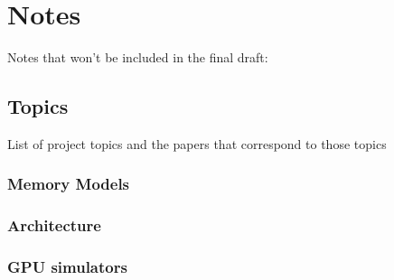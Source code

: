 \documentclass[conference]{IEEEtran}
\begin{document}
\clearpage
\appendix
\section{Notes}
Notes that won't be included in the final draft:
\subsection{Topics}
List of project topics and the papers that correspond to those topics
\subsubsection{Memory Models}
\cite{Bakhoda2009}
\cite{Ibrahim2020}
\cite{Singh2013}
\cite{Pratheek2023}
\cite{Mei2015}
\cite{Liu2018}
\cite{Fung2011ISM}
\cite{Jog2013OWL}
\cite{Kadam2018}
\cite{Liu2020}
\cite{Jog2013}
\subsubsection{Architecture}
\cite{Bakhoda2009}
\cite{Yan2022}
\cite{Hayes2019}
\cite{Sanudo2020}
\cite{Laguna2022}
\cite{Zhu2019}
\cite{Fung2011HPC}
\subsubsection{GPU simulators}
\cite{Khairy2020}
\cite{Kandiah2021}
\cite{Bakhoda2009}
\cite{Hayes2019}
\cite{Raihan2018}
\cite{Liu2020}
\cite{Jog2013}




\end{document}
